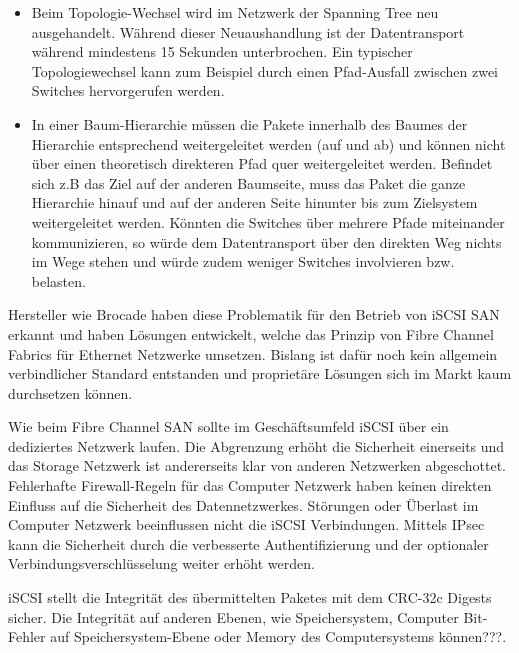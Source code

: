 \begin{itemize}
\item Beim Topologie-Wechsel wird im Netzwerk der Spanning Tree neu ausgehandelt. Während dieser Neuaushandlung ist der Datentransport während mindestens 15 Sekunden unterbrochen. Ein typischer Topologiewechsel kann zum Beispiel durch einen Pfad-Ausfall zwischen zwei Switches hervorgerufen werden.

\item In einer Baum-Hierarchie müssen die Pakete innerhalb des Baumes der Hierarchie entsprechend weitergeleitet werden (auf und ab) und können nicht über einen theoretisch direkteren Pfad quer weitergeleitet werden. Befindet sich z.B das Ziel auf der anderen Baumseite, muss das Paket die ganze Hierarchie hinauf und auf der anderen Seite hinunter bis zum Zielsystem weitergeleitet werden. Könnten die Switches über mehrere Pfade miteinander kommunizieren, so würde dem Datentransport über den direkten Weg nichts im Wege stehen und würde zudem weniger Switches involvieren bzw. belasten.
\end{itemize}

Hersteller wie Brocade haben diese Problematik für den Betrieb von iSCSI SAN erkannt und haben Lösungen entwickelt, welche das Prinzip von Fibre Channel Fabrics für Ethernet Netzwerke umsetzen. Bislang ist dafür noch kein allgemein verbindlicher Standard entstanden und proprietäre Lösungen sich im Markt kaum durchsetzen können.

Wie beim Fibre Channel SAN sollte im Geschäftsumfeld iSCSI über ein dediziertes Netzwerk laufen. Die Abgrenzung erhöht die Sicherheit einerseits und das Storage Netzwerk ist andererseits klar von anderen Netzwerken abgeschottet. Fehlerhafte Firewall-Regeln für das Computer Netzwerk haben keinen direkten Einfluss auf die Sicherheit des Datennetzwerkes. Störungen oder Überlast im Computer Netzwerk beeinflussen nicht die iSCSI Verbindungen. Mittels IPsec kann die Sicherheit durch die verbesserte Authentifizierung und der optionaler Verbindungsverschlüsselung weiter erhöht werden. 

iSCSI stellt die Integrität des übermittelten Paketes mit dem CRC-32c Digests sicher. Die Integrität auf anderen Ebenen, wie Speichersystem, Computer Bit-Fehler auf Speichersystem-Ebene oder Memory des Computersystems können???. 


